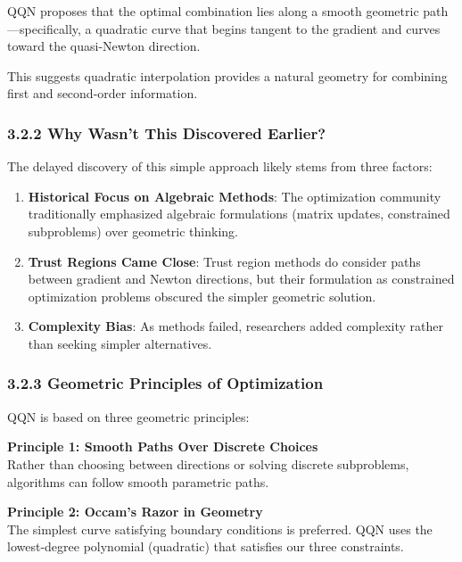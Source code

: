 QQN proposes that the optimal combination lies along a smooth geometric path---specifically, a quadratic curve that
begins tangent to the gradient and curves toward the quasi-Newton direction.

This suggests quadratic interpolation provides a natural geometry for combining first and second-order information.

\hypertarget{why-wasnt-this-discovered-earlier}{%
\subsubsection{3.2.2 Why Wasn't This Discovered Earlier?}\label{why-wasnt-this-discovered-earlier}}

The delayed discovery of this simple approach likely stems from three factors:

\begin{enumerate}
\def\labelenumi{\arabic{enumi}.}
\item
  \textbf{Historical Focus on Algebraic Methods}: The optimization community traditionally emphasized algebraic formulations
  (matrix updates, constrained subproblems) over geometric thinking.
\item
  \textbf{Trust Regions Came Close}: Trust region methods do consider paths between gradient and Newton directions, but
  their formulation as constrained optimization problems obscured the simpler geometric solution.
\item
  \textbf{Complexity Bias}: As methods failed, researchers added complexity rather than seeking simpler alternatives.
\end{enumerate}

\hypertarget{geometric-principles-of-optimization}{%
\subsubsection{3.2.3 Geometric Principles of Optimization}\label{geometric-principles-of-optimization}}

QQN is based on three geometric principles:

\textbf{Principle 1: Smooth Paths Over Discrete Choices}\\
Rather than choosing between directions or solving discrete subproblems, algorithms can follow smooth parametric paths.

\textbf{Principle 2: Occam's Razor in Geometry}\\
The simplest curve satisfying boundary conditions is preferred. QQN uses the lowest-degree polynomial (quadratic) that satisfies our three constraints.

